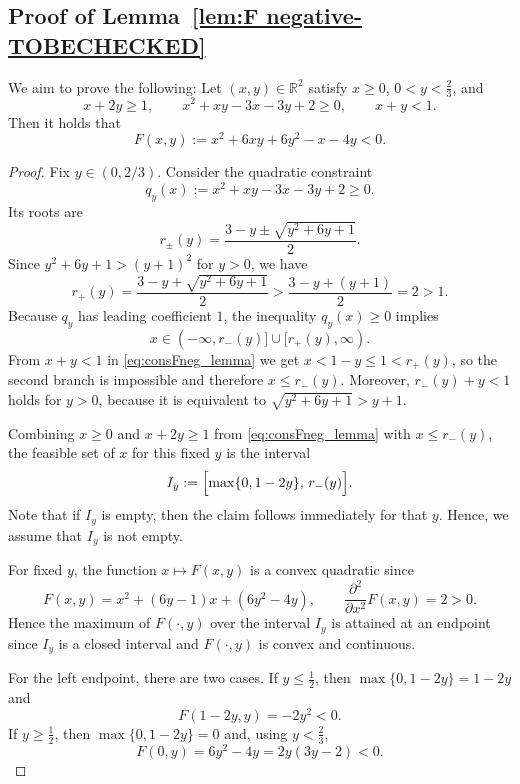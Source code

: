 \documentclass[11pt]{article}
\begin{document}
\subsection{Proof of Lemma~\ref{lem:F negative-TOBECHECKED}}
We aim to prove the following: Let $(x,y)\in\mathbb R^2$ satisfy $x\ge 0$, $0<y<\frac{2}{3}$, and
\begin{equation}\label{eq:consFneg_lemma}
x+2y\ge 1,\qquad
x^2+xy-3x-3y+2\ge 0,\qquad
x+y<1.
\end{equation}
Then it holds that
\begin{equation}\label{eq:FdefFneg_lemma-TOBECHECKED}
F(x,y):=x^2+6xy+6y^2-x-4y<0.
\end{equation}
\begin{proof}
Fix $y\in(0,2/3)$.
Consider the quadratic constraint
\[
q_y(x):=x^2+xy-3x-3y+2\ge 0.
\]
Its roots are
\begin{equation}\label{eq:rootsFneg_lemma}
r_\pm(y)=\frac{3-y\pm\sqrt{y^2+6y+1}}{2}.
\end{equation}
Since
 ${y^2+6y+1}>(y+1)^2$ for $y>0$, we have
\[
r_+(y)=\frac{3-y+\sqrt{y^2+6y+1}}{2}>\frac{3-y+(y+1)}{2}=2>1.
\]
Because $q_y$ has leading coefficient $1$, the inequality $q_y(x)\ge 0$ implies
\[
x\in(-\infty,r_-(y)]\cup[r_+(y),\infty).
\]
From $x+y<1$ in \eqref{eq:consFneg_lemma} we get $x<1-y\le 1<r_+(y)$, so the second branch
is impossible and therefore
\(
x\le r_-(y).
\) 
Moreover, $r_-(y)+y<1$ holds for $y>0$, because it is equivalent to
$\sqrt{y^2+6y+1}>y+1$.

Combining $x\ge 0$ and $x+2y\ge 1$ from \eqref{eq:consFneg_lemma} with $x\le r_-(y)$, the feasible
set of $x$ for this fixed $y$ is the interval
\begin{equation}\label{eq:IyFneg_lemma}
I_y:=\Bigl[\max\{0,1-2y\},\,r_-(y)\Bigr].
\end{equation}
Note that if $I_y$ is empty, then the claim follows immediately for that $y$. Hence, we assume that $I_y$ is not empty.

For fixed $y$, the function $x\mapsto F(x,y)$ is a convex quadratic since
\[
F(x,y)=x^2+(6y-1)x+(6y^2-4y),\qquad \frac{\partial^2}{\partial x^2}F(x,y)=2>0.
\]
Hence the maximum of $F(\cdot,y)$ over the interval $I_y$ is attained at an endpoint since $I_y$ is a closed interval and 
 $F(\cdot,y)$ is convex and continuous.

For the left endpoint, there are two cases.
If $y\le \tfrac12$, then $\max\{0,1-2y\}=1-2y$ and
\begin{equation}\label{eq:leftEndpoint1Fneg_lemma}
F(1-2y,y)=-2y^2<0.
\end{equation}
If $y\ge \tfrac12$, then $\max\{0,1-2y\}=0$ and, using $y<\tfrac23$,
\begin{equation}\label{eq:leftEndpoint2Fneg_lemma}
F(0,y)=6y^2-4y=2y(3y-2)<0.
\end{equation}


\end{proof}
\end{document}
